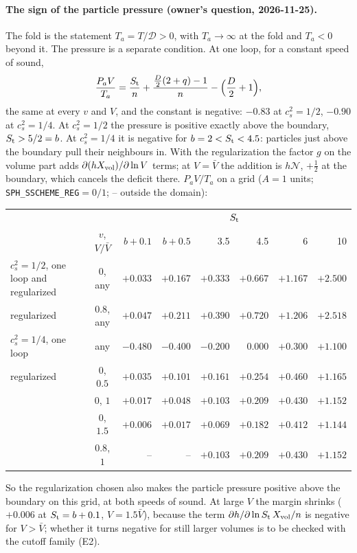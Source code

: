 \documentclass[11pt,aps,preprint,nofootinbib,superscriptaddress,tightenlines]{revtex4-2}
\def\st{\begin{equation}}
\def\stp{\end{equation}}
\let\oldparagraph\paragraph
\renewcommand{\paragraph}{\par\bigskip\oldparagraph}
\begin{document}
\paragraph{The sign of the particle pressure (owner's question, 2026-11-25).}  The fold is the statement $T_a=T/\mathcal D>0$, with $T_a\to\infty$ at the
fold and $T_a<0$ beyond it.  The pressure is a separate condition.  At one loop, for a constant speed of sound,
\st
\frac{P_aV}{T_a}=\frac{S_{\rm t}}n+\frac{\tfrac D2(2+q)-1}{n}-\Big(\frac D2+1\Big),
\stp
the same at every $v$ and $V$, and the constant is negative: $-0.83$ at $c_s^2=1/2$, $-0.90$ at $c_s^2=1/4$.  At $c_s^2=1/2$ the pressure is positive
exactly above the boundary, $S_{\rm t}>5/2=b$.  At $c_s^2=1/4$ it is negative for $b=2<S_{\rm t}<4.5$: particles just above the boundary pull their
neighbours in.  With the regularization the factor $g$ on the volume part adds $\partial(hX_{\rm vol})/\partial\ln V$ terms; at $V=\bar V$ the
addition is $h\mathcal N$, $+\tfrac12$ at the boundary, which cancels the deficit there.  $P_aV/T_a$ on a grid ($A=1$ units;
\texttt{SPH\_SSCHEME\_REG}$=0/1$; -- outside the domain):
\begin{center}\small
\begin{tabular}{lcrrrrrr}
\toprule
 & & \multicolumn{6}{c}{$S_{\rm t}$} \\
 & $v$, $V/\bar V$ & $b{+}0.1$ & $b{+}0.5$ & 3.5 & 4.5 & 6 & 10 \\
\midrule
$c_s^2=1/2$, one loop and regularized & $0$, any & $+0.033$ & $+0.167$ & $+0.333$ & $+0.667$ & $+1.167$ & $+2.500$ \\
\quad regularized & $0.8$, any & $+0.047$ & $+0.211$ & $+0.390$ & $+0.720$ & $+1.206$ & $+2.518$ \\
$c_s^2=1/4$, one loop & any & $-0.480$ & $-0.400$ & $-0.200$ & $0.000$ & $+0.300$ & $+1.100$ \\
\quad regularized & $0$, $0.5$ & $+0.035$ & $+0.101$ & $+0.161$ & $+0.254$ & $+0.460$ & $+1.165$ \\
 & $0$, $1$ & $+0.017$ & $+0.048$ & $+0.103$ & $+0.209$ & $+0.430$ & $+1.152$ \\
 & $0$, $1.5$ & $+0.006$ & $+0.017$ & $+0.069$ & $+0.182$ & $+0.412$ & $+1.144$ \\
 & $0.8$, $1$ & -- & -- & $+0.103$ & $+0.209$ & $+0.430$ & $+1.152$ \\
\bottomrule
\end{tabular}
\end{center}
So the regularization chosen also makes the particle pressure positive above the boundary on this grid, at both speeds of sound.  At large $V$ the
margin shrinks ($+0.006$ at $S_{\rm t}=b+0.1$, $V=1.5\bar V$), because the term $\partial h/\partial\ln S_{\rm t}\,X_{\rm vol}/n$ is negative for $V>\bar V$;
whether it turns negative for still larger volumes is to be checked with the cutoff family (E2).
\end{document}
